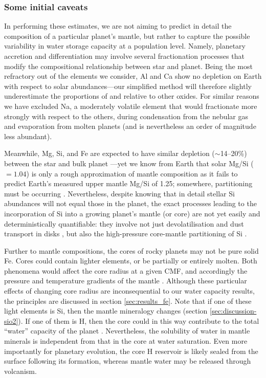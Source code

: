 \documentclass[fleqn,usenatbib]{mnras}
\begin{document}
\subsubsection{Some initial caveats}

In performing these estimates, we are not aiming to predict in detail the composition of a particular planet's mantle, but rather to capture the possible variability in water storage capacity at a population level. Namely, planetary accretion and differentiation may involve several fractionation processes that modify the compositional relationship between star and planet. Being the most refractory out of the elements we consider, Al and Ca show no depletion on Earth with respect to solar abundances---our simplified method will therefore slightly underestimate the proportions of  and  relative to other oxides. For similar reasons we have excluded Na, a moderately volatile element that would fractionate more strongly with respect to the others, during condensation from the nebular gas and evaporation from molten planets (and is nevertheless an order of magnitude less abundant). 

Meanwhile, Mg, Si, and Fe are expected to have similar depletion ($\sim$14--20\%) between the star and bulk planet \citep{wang_enhanced_2019}---yet we know from Earth that solar Mg/Si ($=1.04$) is only a rough approximation of mantle composition as it fails to predict Earth's measured upper mantle Mg/Si of 1.25; somewhere, partitioning must be occurring \citep[see also section \ref{sec:discussion-sio2}]{ringwood_significance_1989, mcdonough_composition_1995, lodders_abundances_2009}. Nevertheless, despite knowing that in detail stellar Si abundances will not equal those in the planet, the exact processes leading to the incorporation of Si into a growing planet's mantle (or core) are not yet easily and deterministically quantifiable: they involve not just devolatilisation and dust transport in disks \citep{miyazaki_dynamic_2020}, but also the high-pressure core-mantle partitioning of Si \citep{fischer_high_2015}.

Further to mantle compositions, the cores of rocky planets may not be pure solid Fe. Cores could contain lighter elements, or be partially or entirely molten. Both phenomena would affect the core radius at a given CMF, and accordingly the pressure and temperature gradients of the mantle \citep{unterborn_scaling_2016}. Although these particular effects of changing core radius are inconsequential to our water capacity results, the principles are discussed in section \ref{sec:results_fe}. Note that if one of these light elements is Si, then the mantle mineralogy changes (section \ref{sec:discussion-sio2}). If one of them is H, then the core could in this way contribute to the total ``water'' capacity of the planet \citep{shah_internal_2021}. Nevertheless, the solubility of water in mantle minerals is independent from that in the core at water saturation. Even more importantly for planetary evolution, the core H reservoir is likely sealed from the surface following its formation, whereas mantle water may be released through volcanism.
\end{document}
